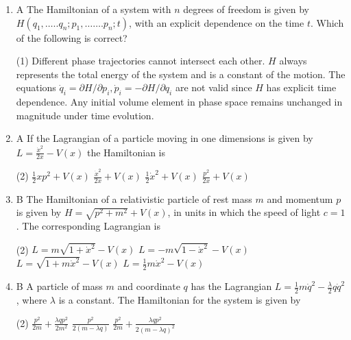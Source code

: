 \begin{enumerate}
	\item A The Hamiltonian of a system with $n$ degrees of freedom is given by $H\left(q_{1}, \ldots . . q_{n} ; p_{1}, \ldots \ldots . p_{n} ; t\right)$, with an explicit dependence on the time $t$. Which of the following is correct?
	{}
	 \begin{tasks}(1)
		\task[\textbf{a.}]Different phase trajectories cannot intersect each other.
		\task[\textbf{b.}]$H$ always represents the total energy of the system and is a constant of the motion.
		\task[\textbf{c.}]The equations $\dot{q}_{i}=\partial H / \partial p_{i}, \dot{p}_{i}=-\partial H / \partial q_{i}$ are not valid since $H$ has explicit time dependence.
		\task[\textbf{d.}]  Any initial volume element in phase space remains unchanged in magnitude under time evolution.
	\end{tasks}
	\item A If the Lagrangian of a particle moving in one dimensions is given by $L=\frac{\dot{x}^{2}}{2 x}-V(x)$ the Hamiltonian is
	{}
	 \begin{tasks}(2)
		\task[\textbf{a.}]$\frac{1}{2} x p^{2}+V(x)$
		\task[\textbf{b.}]$\frac{\dot{x}^{2}}{2 x}+V(x)$
		\task[\textbf{c.}] $\frac{1}{2} \dot{x}^{2}+V(x)$
		\task[\textbf{d.}] $\frac{p^{2}}{2 x}+V(x)$
	\end{tasks}
	\item B The Hamiltonian of a relativistic particle of rest mass $m$ and momentum $p$ is given by $H=\sqrt{p^{2}+m^{2}}+V(x)$, in units in which the speed of light $c=1$. The corresponding Lagrangian is
	{}
	 \begin{tasks}(2)
		\task[\textbf{a.}]$L=m \sqrt{1+\dot{x}^{2}}-V(x)$
		\task[\textbf{b.}]$L=-m \sqrt{1-\dot{x}^{2}}-V(x)$
		\task[\textbf{c.}]$L=\sqrt{1+m \dot{x}^{2}}-V(x)$
		\task[\textbf{d.}] $L=\frac{1}{2} m \dot{x}^{2}-V(x)$
	\end{tasks}
	\item B A particle of mass $m$ and coordinate $q$ has the Lagrangian $L=\frac{1}{2} m \dot{q}^{2}-\frac{\lambda}{2} q \dot{q}^{2}$, where $\lambda$ is a constant. The Hamiltonian for the system is given by
	{}
	 \begin{tasks}(2)
		\task[\textbf{a.}]$\frac{p^{2}}{2 m}+\frac{\lambda q p^{2}}{2 m^{2}}$
		\task[\textbf{b.}]$\frac{p^{2}}{2(m-\lambda q)}$
		\task[\textbf{c.}] $\frac{p^{2}}{2 m}+\frac{\lambda q p^{2}}{2(m-\lambda q)^{2}}$

\end{tasks}
\end{enumerate}
